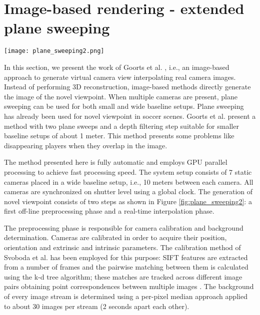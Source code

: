 \section{Image-based rendering - extended plane sweeping}


\begin{figure*}[htbp]
\centerline{\texttt{[image: plane\_sweeping2.png]}}
\caption{Overview of the extended plane sweeping method. Both the non real-time and real-time phase are shown \cite{05_plane_sweeping}.}
\label{fig:plane_sweeping2}
\end{figure*}

In this section, we present the work of Goorts et al. \cite{05_plane_sweeping}, i.e., an image-based approach to generate 
virtual camera view interpolating real camera images.
Instead of performing 3D reconstruction, image-based methods directly generate the image of the novel viewpoint.
When multiple cameras are present, plane sweeping can be used \cite{05_plane_sweeping_yang} for both small and wide 
baseline setups.
Plane sweeping has already been used for novel viewpoint in soccer scenes. Goorts et al. \cite{05_plane_sweeping_2013} 
present a method with two plane sweeps and a depth filtering step suitable for smaller baseline 
setups of about 1 meter. 
This method presents some problems like disappearing players
when they overlap in the image.

The method presented here is fully automatic and employs GPU
parallel processing to achieve fast processing speed.
The system setup consists of 7 static cameras placed in a
wide baseline setup, i.e., 10 meters between each camera.
All cameras are synchronized on shutter level using a global clock.
The generation of novel viewpoint consists of two steps as shown in Figure \ref{fig:plane_sweeping2}:
a first off-line preprocessing phase and a real-time interpolation phase. 

The preprocessing phase is responsible for camera calibration and background determination.
Cameras are calibrated in order to acquire their position, orientation and extrinsic and intrinsic parameters.
The calibration method of Svoboda et al. \cite{05_plane_sweeping_Svoboda} has been employed for this purpose:
SIFT features are extracted from a number of frames and the pairwise matching between them is calculated 
using the k-d tree algorithm; these matches are tracked across different image pairs obtaining point 
correspondences between multiple images \cite{05_plane_sweeping}.
The background of every image stream is determined using a per-pixel median approach applied to about 30 images
per stream (2 seconds apart each other).


